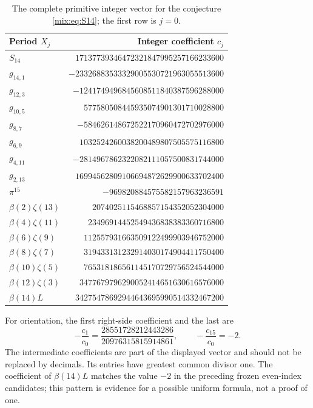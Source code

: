 \begin{table}[htbp]
\centering\small
\begin{tabular}{@{}lr@{}}
\toprule
Period $X_j$ & Integer coefficient $c_j$\\
\midrule
$S_{14}$ & $17137739346472321847995257166233600$ \\
$g_{14,1}$ & $-23326883533329005530721963055513600$ \\
$g_{12,3}$ & $-1241749496845608511840387596288000$ \\
$g_{10,5}$ & $577580508445935074901301710028800$ \\
$g_{8,7}$ & $-584626148672522170960472702976000$ \\
$g_{6,9}$ & $1032524260038200489807505575116800$ \\
$g_{4,11}$ & $-2814967862322082111057500831744000$ \\
$g_{2,13}$ & $16994562809106694872629900633702400$ \\
$\pi^{15}$ & $-969820884575582157963236591$ \\
$\beta(2)\zeta(13)$ & $2074025115468857154352052304000$ \\
$\beta(4)\zeta(11)$ & $23496914452549436838383360716800$ \\
$\beta(6)\zeta(9)$ & $112557931663509122499903946752000$ \\
$\beta(8)\zeta(7)$ & $319433131232914030174904411750400$ \\
$\beta(10)\zeta(5)$ & $765318186561145170729756524544000$ \\
$\beta(12)\zeta(3)$ & $3477679796290052414651630616576000$ \\
$\beta(14)L$ & $34275478692944643695990514332467200$ \\
\bottomrule
\end{tabular}
\caption{The complete primitive integer vector for the conjecture
\eqref{mix:eq:S14}; the first row is $j=0$.}
\label{mix:tab:S14}
\end{table}

For orientation, the first right-side coefficient and the last are
\[
 -\frac{c_1}{c_0}=\frac{28551728212443286}{20976315815914861},
 \qquad
 -\frac{c_{15}}{c_0}=-2.
\]
The intermediate coefficients are part of the displayed vector and
should not be replaced by decimals.  Its entries have greatest common
divisor one.  The coefficient of $\beta(14)L$ matches the value $-2$
in the preceding frozen even-index candidates; this pattern is evidence
for a possible uniform formula, not a proof of one.


